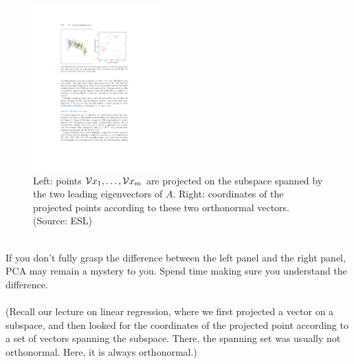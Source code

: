 \begin{figure}[H]
  \centering
  \includegraphics[height=2.5in]{pca_proj_colors.pdf}    
  \caption{Left: points $\mathcal{V}{x}_1,\ldots,\mathcal{V}{x}_m$ are projected on the 
  subspace spanned by the two leading eigenvectors of $A$. Right: coordinates of
the projected points according to these two orthonormal vectors. (Source: ESL)}
\end{figure}
~\\
If you don't fully grasp the difference between the left panel and the right panel,
PCA may remain a mystery to you. Spend time making sure you understand the
difference.
\\~\\
(Recall our lecture on linear regression, where we first projected a vector on a
subspace, and then looked for the coordinates of the projected point according
to a set of vectors spanning the subspace. There, the spanning set was usually
not orthonormal. Here, it is always orthonormal.)

